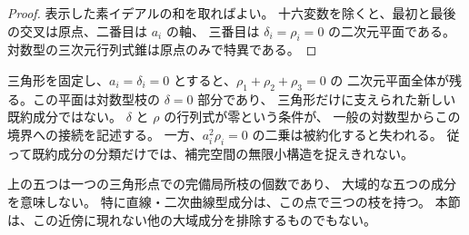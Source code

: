 \begin{proof}
表示した素イデアルの和を取ればよい。
十六変数を除くと、最初と最後の交叉は原点、二番目は $a_i$ の軸、
三番目は $\delta_i=\rho_i=0$ の二次元平面である。
対数型の三次元行列式錐は原点のみで特異である。
\end{proof}

\begin{remark}[二つの残余方向の意味]
三角形を固定し、$a_i=\delta_i=0$ とすると、$\rho_1+\rho_2+\rho_3=0$ の
二次元平面全体が残る。この平面は対数型枝の $\delta=0$ 部分であり、
三角形だけに支えられた新しい既約成分ではない。
$\delta$ と $\rho$ の行列式が零という条件が、
一般の対数型からこの境界への接続を記述する。
一方、$a_i^2\rho_i=0$ の二乗は被約化すると失われる。
従って既約成分の分類だけでは、補完空間の無限小構造を捉えきれない。
\end{remark}

\begin{remark}[局所成分数と大域成分数]
上の五つは一つの三角形点での完備局所枝の個数であり、
大域的な五つの成分を意味しない。
特に直線・二次曲線型成分は、この点で三つの枝を持つ。
本節は、この近傍に現れない他の大域成分を排除するものでもない。
\end{remark}
